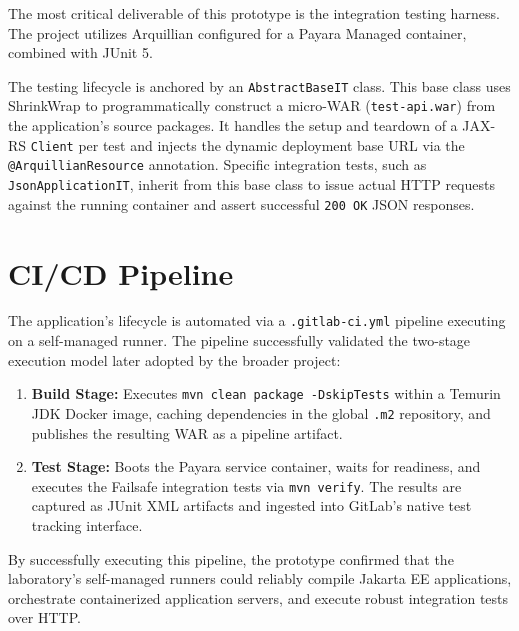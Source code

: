 The most critical deliverable of this prototype is the integration testing harness.
The project utilizes Arquillian configured for a Payara Managed container, combined
with JUnit 5.

The testing lifecycle is anchored by an \texttt{AbstractBaseIT} class. This
base class uses ShrinkWrap to programmatically construct a micro-\ac{WAR} (\texttt{test-api.war})
from the application's source packages. It handles the setup and teardown of
a \ac{JAX-RS} \texttt{Client} per test and injects the dynamic deployment base
URL via the \texttt{@ArquillianResource} annotation. Specific integration tests,
such as \texttt{JsonApplicationIT}, inherit from this base class to issue
actual \ac{HTTP} requests against the running container and assert successful
\texttt{200 OK} \ac{JSON} responses.

\section{CI/CD Pipeline}
\label{app:proto1-pipeline}

The application's lifecycle is automated via a \texttt{.gitlab-ci.yml} pipeline
executing on a self-managed runner. The pipeline successfully validated the
two-stage execution model later adopted by the broader project:

\begin{enumerate}
	\item \textbf{Build Stage:} Executes \texttt{mvn clean package -DskipTests}
		within a Temurin JDK Docker image, caching dependencies in the global
		\texttt{.m2} repository, and publishes the resulting \ac{WAR} as a pipeline
		artifact.

	\item \textbf{Test Stage:} Boots the Payara service container, waits for readiness,
		and executes the Failsafe integration tests via \texttt{mvn verify}.
		The results are captured as JUnit \ac{XML} artifacts and ingested into GitLab's
		native test tracking interface.
\end{enumerate}

By successfully executing this pipeline, the prototype confirmed that the
laboratory's self-managed runners could reliably compile Jakarta EE
applications, orchestrate containerized application servers, and execute
robust integration tests over \ac{HTTP}.